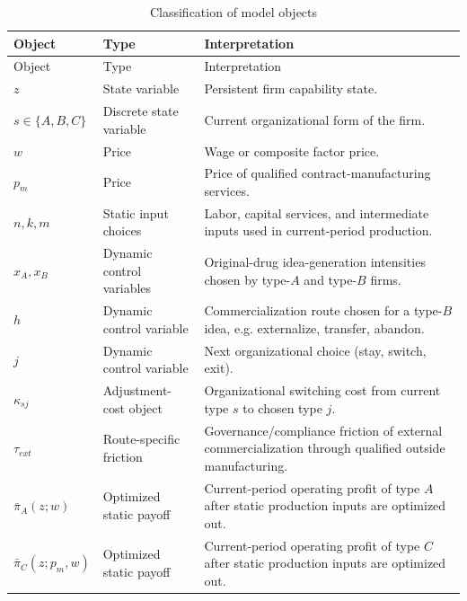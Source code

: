 \documentclass[12pt,fontset=none]{ctexart}
\begin{document}
\small
\setlength{\tabcolsep}{3pt}
\begin{longtable}{@{}P{0.19\textwidth}P{0.21\textwidth}P{0.52\textwidth}@{}}
\caption{Classification of model objects}\label{tab:objects}\\
\toprule
Object & Type & Interpretation \\
\midrule
\endfirsthead
\toprule
Object & Type & Interpretation \\
\midrule
\endhead

$z$ & State variable & Persistent firm capability state. \\[0.4em]

$s\in\{A,B,C\}$ & Discrete state variable & Current organizational form of the firm. \\[0.4em]

$w$ & Price & Wage or composite factor price. \\[0.4em]

$p_m$ & Price & Price of qualified contract-manufacturing services. \\[0.4em]

$n,k,m$ & Static input choices & Labor, capital services, and intermediate inputs used in current-period production. \\[0.4em]

$x_A,x_B$ & Dynamic control variables & Original-drug idea-generation intensities chosen by type-$A$ and type-$B$ firms. \\[0.4em]

$h$ & Dynamic control variable & Commercialization route chosen for a type-$B$ idea, e.g. externalize, transfer, abandon. \\[0.4em]

$j$ & Dynamic control variable & Next organizational choice (stay, switch, exit). \\[0.4em]

$\kappa_{sj}$ & Adjustment-cost object & Organizational switching cost from current type $s$ to chosen type $j$. \\[0.4em]

$\tau_{ext}$ & Route-specific friction & Governance/compliance friction of external commercialization through qualified outside manufacturing. \\[0.4em]

$\bar{\pi}_A(z;w)$ & Optimized static payoff & Current-period operating profit of type $A$ after static production inputs are optimized out. \\[0.4em]

$\bar{\pi}_C(z;p_m,w)$ & Optimized static payoff & Current-period operating profit of type $C$ after static production inputs are optimized out. \\[0.4em]


\end{longtable}
\end{document}
